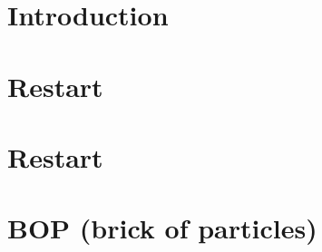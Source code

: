 \documentclass{article}
\begin{document}
\maketitle

\section{Introduction}


\section{Restart}






\appendix
\section{Restart}\label{a:restart}


\section{BOP (brick of particles)}\label{a:bop}

\end{document}
